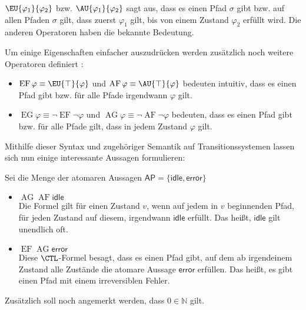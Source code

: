 $\EU{\varphi_1}{\varphi_2}$ bzw. $\AU{\varphi_1}{\varphi_2}$ sagt aus, dass es einen Pfad $\sigma$ gibt bzw. auf allen Pfaden $\sigma$ gilt, dass zuerst $\varphi_1$ gilt, bis von einem Zustand $\varphi_2$ erfüllt wird.
Die anderen Operatoren haben die bekannte Bedeutung.

Um einige Eigenschaften einfacher auszudrücken werden zusätzlich noch weitere Operatoren definiert \cite{clarke1982design}:
\begin{itemize}
	\item $\operatorname{EF}\varphi \equiv \EU{\top}{\varphi}$ und $\operatorname{AF}\varphi \equiv \AU{\top}{\varphi}$ bedeuten intuitiv, dass es einen Pfad gibt bzw. für alle Pfade irgendwann $\varphi$ gilt.
	\item $\operatorname{EG}\varphi \equiv \neg\operatorname{EF}\neg\varphi$ und $\operatorname{AG}\varphi \equiv \neg\operatorname{AF}\neg\varphi$ bedeuten, dass es einen Pfad gibt bzw. für alle Pfade gilt, dass in jedem Zustand $\varphi$ gilt.
\end{itemize}
Mithilfe dieser Syntax und zugehöriger Semantik auf Transitionssystemen lassen sich nun einige interessante Aussagen formulieren:
\begin{example}
	Sei die Menge der atomaren Aussagen $\mathsf{AP}=\{\mathsf{idle}, \mathsf{error}\}$
	\begin{itemize}
		\item $\operatorname{AG}\operatorname{AF}\mathsf{idle}$ \\ Die Formel gilt für einen Zustand $v$, wenn auf jedem in $v$ beginnenden Pfad, für jeden Zustand auf diesem, irgendwann $\mathsf{idle}$ erfüllt. Das heißt, $\mathsf{idle}$ gilt unendlich oft.
		\item $\operatorname{EF}\operatorname{AG}\mathsf{error}$ \\
		Diese $\CTL$-Formel besagt, dass es einen Pfad gibt, auf dem ab irgendeinem Zustand alle Zustände die atomare Aussage $\mathsf{error}$ erfüllen. Das heißt, es gibt einen Pfad mit einem irreversiblen Fehler.
	\end{itemize}
\end{example}

Zusätzlich soll noch angemerkt werden, dass $0\in \mathbb{N}$ gilt.